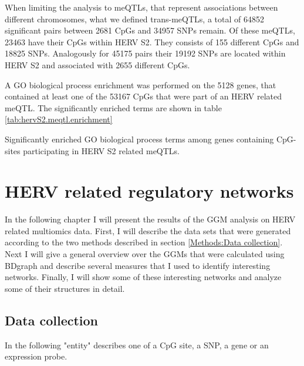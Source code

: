 \documentclass[a4paper,12pt,twoside,openright]{report}
\begin{document}
When limiting the analysis to meQTLs, that represent associations between different chromosomes, what we defined trans-meQTLs, a total of 64852 significant pairs between 2681 CpGs and 34957 SNPs remain. Of these meQTLs, 23463 have their CpGs within HERV S2. They consists of 155 different CpGs and 18825 SNPs. Analogously for 45175 pairs their 19192 SNPs are located within HERV S2 and associated with 2655 different CpGs.

A GO biological process enrichment was performed on the 5128 genes, that contained at least one of the 53167 CpGs that were part of an HERV related meQTL. The significantly enriched terms are shown in table \ref{tab:hervS2.meqtl.enrichment}

\begin{table}[h!]
  \begin{center}
  \end{center}        
	\caption{Significantly enriched GO biological process terms among genes containing CpG-sites participating in HERV S2 related meQTLs.}
	\label{tab:hervS2.meqtl.enrichment}
\end{table}

\section{HERV related regulatory networks}
\label{Results:HERV related regulatory networks}
In the following chapter I will present the results of the GGM analysis on HERV related multiomics data. First, I will describe the data sets that were generated according to the two methods described in section \ref{Methods:Data collection}. Next I will give a general overview over the GGMs that were calculated using BDgraph and describe several measures that I used to identify interesting networks. Finally, I will show some of these interesting networks and analyze some of their structures in detail.

\subsection{Data collection}
\label{Results:Data collection}
In the following "entity" describes one of a CpG site, a SNP, a gene or an expression probe.
\end{document}
